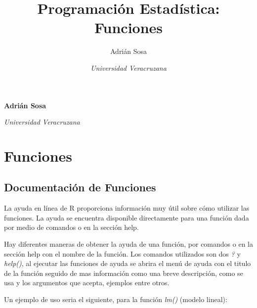 \documentclass[11pt,]{article}
\title{Programación Estadística: Funciones  }
\author{\Large Adrián Sosa\vspace{0.05in} \newline\normalsize\emph{}   \and \Large \vspace{0.05in} \newline\normalsize\emph{Universidad Veracruzana}  }
\date{}
\newcommand*{\authorfont}{\fontfamily{phv}\selectfont}
\begin{document}
	
%

{%
\setlength{\parindent}{0pt}
\thispagestyle{plain}
{\fontsize{18}{20}\selectfont\raggedright 
\maketitle  %

}

{
   \vskip 13.5pt\relax \normalsize\fontsize{11}{12} 
\textbf{\authorfont Adrián Sosa} \hskip 15pt \emph{\small }   \par \textbf{\authorfont } \hskip 15pt \emph{\small Universidad Veracruzana}   

}

}






\vskip -8.5pt



\noindent  

\hypertarget{funciones}{%
\section{Funciones}\label{funciones}}

\hypertarget{documentaciuxf3n-de-funciones}{%
\subsection{Documentación de
Funciones}\label{documentaciuxf3n-de-funciones}}

La ayuda en línea de R proporciona información muy útil sobre cómo
utilizar las funciones. La ayuda se encuentra disponible directamente
para una función dada por medio de comandos o en la sección help.

Hay diferentes maneras de obtener la ayuda de una función, por comandos
o en la sección help con el nombre de la función. Los comandos
utilizados son dos \emph{?} y \emph{help()}, al ejecutar las funciones
de ayuda se abrira el menú de ayuda con el titulo de la función seguido
de mas información como una breve descripción, como se usa y los
argumentos que acepta, ejemplos entre otros.

Un ejemplo de uso seria el siguiente, para la función \emph{lm()}
(modelo lineal):
\end{document}
